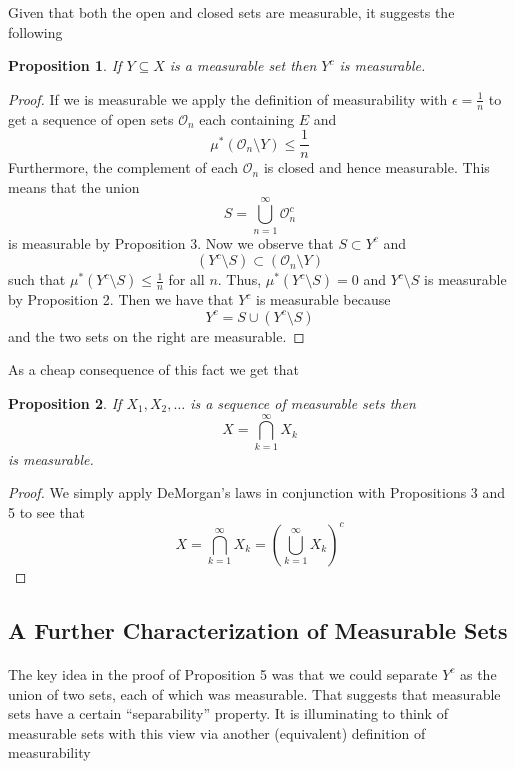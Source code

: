 \documentclass{article}
\newtheorem*{prop}{Proposition}
\begin{document}
Given that both the open and closed sets are measurable, it suggests the following
\begin{prop}
If $Y \subseteq X$ is a measurable set then $Y^c$ is measurable.
\end{prop}
\begin{proof}
If we is measurable we apply the definition of measurability with $\epsilon = \frac{1}{n}$ to get a sequence of open sets $\mathcal{O}_n$ each containing $E$ and 
\[
\mu^*(\mathcal{O}_n \setminus Y) \leq \frac{1}{n}
\]
Furthermore, the complement of each $\mathcal{O}_n$ is closed and hence measurable. This means that the union 
\[
S = \bigcup _{n=1}^\infty \mathcal{O}_n^c
\]
is measurable by Proposition 3. Now we observe that $S \subset Y^c$ and 
\[
(Y^c \setminus S) \subset (\mathcal{O}_n \setminus Y)
\]
such that $\mu^*(Y^c\setminus S) \leq \frac{1}{n}$ for all $n$. Thus, $\mu^*(Y^c\setminus S) = 0$ and $Y^c \setminus S$ is measurable by Proposition 2. Then we have that $Y^c$ is measurable because 
\[
Y^c = S \cup (Y^c \setminus S)
\] 
and the two sets on the right are measurable.
\end{proof}

As a cheap consequence of this fact we get that \\
\begin{prop}
If $X_1, X_2, \ldots$ is a sequence of measurable sets then 
\[
X = \bigcap_{k=1}^\infty X_k
\]
is measurable.
\end{prop}
\begin{proof}
We simply apply DeMorgan's laws in conjunction with Propositions 3 and 5 to see that 
\[
X = \bigcap_{k=1}^\infty X_k = \left(\bigcup_{k=1}^\infty X_k\right)^c
\]
\end{proof}

\subsection{A Further Characterization of Measurable Sets}
\paragraph*{} The key idea in the proof of Proposition 5 was that we could separate $Y^c$ as the union of two sets, each of which was measurable. That suggests that measurable sets have a certain ``separability'' property. It is illuminating to think of measurable sets with this view via another (equivalent) definition of measurability \\
\end{document}
